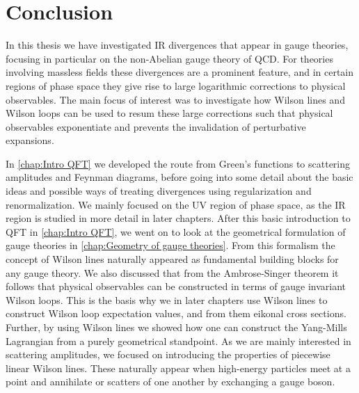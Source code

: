 \newpage
\chapter*{Conclusion}
In this thesis we have investigated IR divergences that appear in gauge theories, focusing in particular on the non-Abelian gauge theory of QCD. For theories involving massless fields these divergences are a prominent feature, and in certain regions of phase space they give rise to large logarithmic corrections to physical observables. The main focus of interest was to investigate how Wilson lines and Wilson loops can be used to resum these large corrections such that physical observables exponentiate and prevents the invalidation of perturbative expansions.

\medskip
In \cref{chap:Intro QFT} we developed the route from Green's functions to scattering amplitudes and Feynman diagrams, before going into some detail about the basic ideas and possible ways of treating divergences using regularization and renormalization. We mainly focused on the UV region of phase space, as the IR region is studied in more detail in later chapters.
After this basic introduction to QFT in \cref{chap:Intro QFT}, we went on to look at the geometrical formulation of gauge theories in \cref{chap:Geometry of gauge theories}. From this formalism the concept of Wilson lines naturally appeared as fundamental building blocks for any gauge theory. We also discussed that from the Ambrose-Singer theorem it follows that physical observables can be constructed in terms of gauge invariant Wilson loops. This is the basis why we in later chapters use Wilson lines to construct Wilson loop expectation values, and from them eikonal cross sections. Further, by using Wilson lines we showed how one can construct the Yang-Mills Lagrangian from a purely geometrical standpoint. As we are mainly interested in scattering amplitudes, we focused on introducing the properties of piecewise linear Wilson lines. These naturally appear when high-energy particles meet at a point and annihilate or scatters of one another by exchanging a gauge boson.

